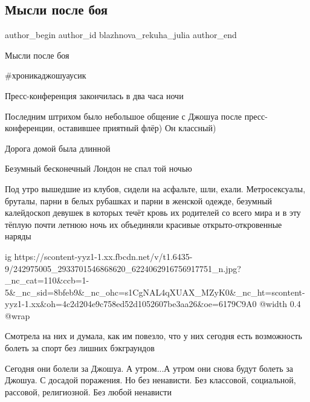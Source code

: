  
 
 
 
 
 
\subsection{Мысли после боя}
\label{sec:27_09_2021.fb.blazhnova_rekuha_julia.1.mysli_posle_boja_usik}
 
\ifcmt
 author_begin
   author_id blazhnova_rekuha_julia
 author_end
\fi

Мысли после боя 

\#хроникаджошуаусик 

Пресс-конференция закончилась в два часа ночи

Последним штрихом было небольшое общение с Джошуа после пресс-конференции,
оставившее приятный флёр) Он классный)

Дорога домой была длинной

Безумный бесконечный Лондон не спал той ночью

Под утро вышедшие из клубов, сидели на асфальте, шли, ехали. Метросексуалы,
бруталы, парни в белых рубашках и парни в женской одежде, безумный калейдоскоп
девушек в которых течёт кровь их родителей со всего мира и в эту тёплую почти
летнюю ночь их объединяли красивые открыто-откровенные наряды

\ifcmt
  ig https://scontent-yyz1-1.xx.fbcdn.net/v/t1.6435-9/242975005_2933701546868620_6224062916756917751_n.jpg?_nc_cat=110&ccb=1-5&_nc_sid=8bfeb9&_nc_ohc=s1CgNAL4qXUAX_MZyK0&_nc_ht=scontent-yyz1-1.xx&oh=4c2d204e9c758ed52d1052607be3aa26&oe=6179C9A0
  @width 0.4
  @wrap 
\fi

Смотрела на них и думала, как им повезло, что у них сегодня есть возможность
болеть за спорт без лишних бэкграундов 

Сегодня они болели за Джошуа. А утром...А утром они снова будут болеть за
Джошуа. С досадой поражения. Но без ненависти. Без классовой, социальной,
рассовой, религиозной. Без любой ненависти 

